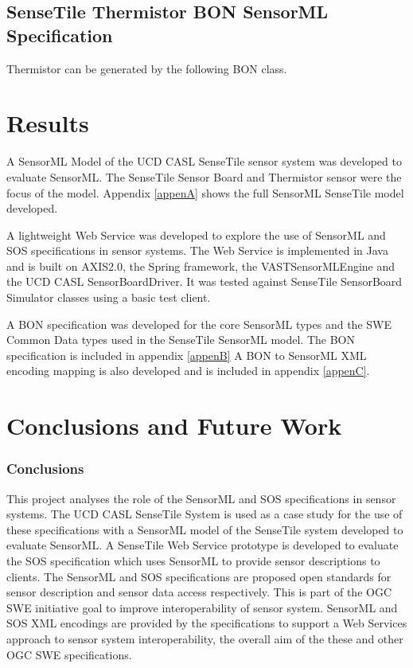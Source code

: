 \documentclass[]{final_report}
\begin{document}
\section{SenseTile Thermistor BON SensorML Specification }
Thermistor can be generated by the following BON class.

\chapter{Results}

A  SensorML Model of the UCD CASL SenseTile sensor system was developed to evaluate SensorML. The SenseTile Sensor Board and Thermistor sensor were the focus of the model. Appendix \ref{appenA} shows the full SensorML SenseTile model developed.

A lightweight Web Service was developed to explore the use of SensorML and SOS specifications in sensor systems. The Web Service is implemented in Java and is built on AXIS2.0, the Spring framework, the VASTSensorMLEngine and the UCD CASL SensorBoardDriver. It was tested against SenseTile SensorBoard Simulator classes using a basic test client.

A BON specification was developed for the core SensorML types and the SWE Common Data types used in the SenseTile SensorML model. The BON specification is included in appendix \ref{appenB} A BON to SensorML XML encoding mapping is also developed and is included in appendix \ref{appenC}.

\chapter{ Conclusions and Future Work}
\subsection{Conclusions}
This project analyses the role of the SensorML and SOS specifications in sensor systems. The UCD CASL SenseTile System is used as a case study for the use of these specifications with a SensorML model of the SenseTile system developed to evaluate SensorML. A SenseTile Web Service prototype is developed to evaluate the SOS specification which uses SensorML to provide sensor descriptions to clients. The SensorML and SOS specifications are proposed open standards for sensor description and sensor data access respectively. This is part of the OGC SWE initiative goal to improve interoperability of sensor system. SensorML and SOS XML encodings are provided by the specifications to support a Web Services approach to sensor system interoperability, the overall aim of the these and other OGC SWE specifications.
\end{document}
